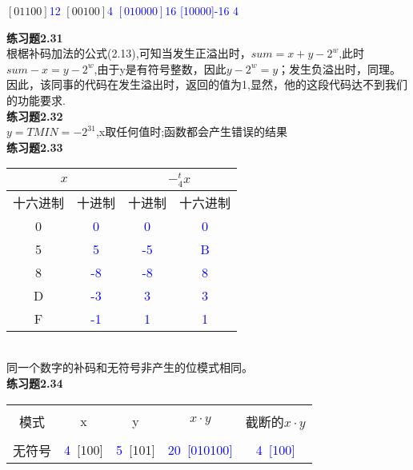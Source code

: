 \documentclass{article}
\begin{document}
\begin{CJK}{UTF8}{uyhei}
\begin{tabbing}
	$[01100]$\hspace{2em}\textcolor{blue}{12}	\>	$[00100]$\hspace{2em}\textcolor{blue}{4}	\>	\textcolor{blue}{$[010000]$\hspace{2em}16}		\>	\textcolor{blue}{[10000]\hspace{2em}-16}\>	\hspace{3em}\textcolor{blue}4		\\[1ex]
\end{tabbing}
\textbf{练习题2.31}	\\[2ex]
根椐补码加法的公式(2.13),可知当发生正溢出时，$sum=x+y-2^w$,此时$sum-x=y-2^w$,由于y是有符号整数，因此$y-2^w=y$；发生负溢出时，同理。因此，该同事的代码在发生溢出时，返回的值为1,显然，他的这段代码达不到我们的功能要求.	\\[3ex]
\textbf{练习题2.32}	\\[2ex]
$y=TMIN=-2^{31}$,x取任何值时;函数都会产生错误的结果	\\[3ex]
\textbf{练习题2.33}	\\[1ex]
\begin{tabular}[t]{cc|cc}
	\hline
	\multicolumn{2}{c}{$x$}				&	\multicolumn{2}{c}{$-_4^tx$}				\\
	\hline
	十六进制	&	十进制			&	十进制			&	十六进制		\\
	\hline
	0		&	\textcolor{blue}0	&	\textcolor{blue}0	&	\textcolor{blue}{0}	\\
	\hline
	5		&	\textcolor{blue}5	&	\textcolor{blue}{-5}	&	\textcolor{blue}{B}	\\
	\hline
	8		&	\textcolor{blue}{-8}	&	\textcolor{blue}{-8}	&	\textcolor{blue}{8}	\\
	\hline
	D		&	\textcolor{blue}{-3}	&	\textcolor{blue}{3}	&	\textcolor{blue}{3}	\\
	\hline
	F		&	\textcolor{blue}{-1}	&	\textcolor{blue}{1}	&	\textcolor{blue}{1}	\\
	\hline
\end{tabular}\\[1ex]
同一个数字的补码和无符号非产生的位模式相同。	\\[3ex]
\textbf{练习题2.34}	\\[1ex]
\begin{tabular}[t]{|c|c|c|c|c|}
	\hline	\\[-2ex]
	模式	&	x	&	y	&	$x\cdot y$	&	截断的$x\cdot y$	\\
	\hline	\\[-2ex]
	无符号	&	\textcolor{blue}{4}\ [100]	&	\textcolor{blue}{5}\ [101]	&	\textcolor{blue}{20}\ \textcolor{blue}{[010100]}		&	\textcolor{blue}{4}\ \textcolor{blue}{[100]}			\\[1ex]

\end{tabular}
\end{CJK}
\end{document}

